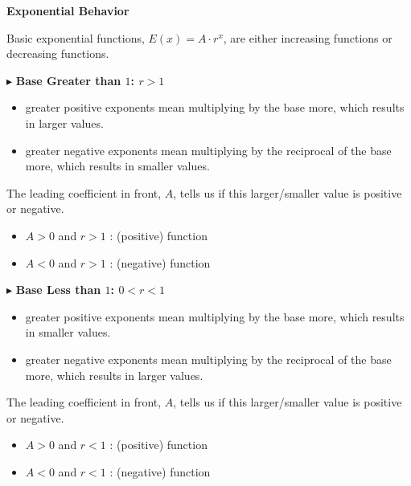 \documentclass{ximera}
\begin{document}
\begin{summary} \textbf{\textcolor{red!70!yellow}{Exponential Behavior}}


Basic exponential functions, $E(x) = A \cdot r^x$, are either increasing functions or decreasing functions.


$\blacktriangleright$  \textbf{\textcolor{purple!85!blue}{Base Greater than $1$: $r > 1$}} 


\begin{itemize}
\item greater positive exponents mean multiplying by the base more, which results in larger values.  
\item greater negative exponents mean multiplying by the reciprocal of the base more, which results in smaller values.  
\end{itemize}


The leading coefficient in front, $A$, tells us if this larger/smaller value is positive or negative.


\begin{itemize}
\item $A > 0$ and $r > 1$ :   (positive) function
\item $A < 0$ and $r > 1$ :   (negative) function  
\end{itemize}






$\blacktriangleright$  \textbf{\textcolor{purple!85!blue}{Base Less than $1$: $0 < r < 1$}}  


\begin{itemize} 
\item greater positive exponents mean multiplying by the base more, which results in smaller values.  
\item greater negative exponents mean multiplying by the reciprocal of the base more, which results in larger values.  
\end{itemize}


The leading coefficient in front, $A$, tells us if this larger/smaller value is positive or negative.


\begin{itemize}
\item $A > 0$ and $r < 1$ :   (positive) function
\item $A < 0$ and $r < 1$ :   (negative) function  
\end{itemize}



\end{summary}
\end{document}
